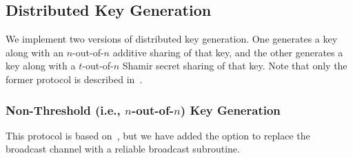 \documentclass[11pt]{article}
\newcommand{\?}[1]{\stackrel{?}{#1}}
\begin{document}
\subsection{Distributed Key Generation}
We implement two versions of distributed key generation. One generates a key along with an $n$-out-of-$n$ additive sharing of that key, and the other generates a key along with a $t$-out-of-$n$ Shamir secret sharing of that key. Note that only the former protocol is described in~\cite{cggmp21}.

\subsubsection{Non-Threshold (i.e., $n$-out-of-$n$) Key Generation}
\label{sec:n-of-n-dkg}

This protocol is based on~\cite[Figure~5]{cggmp21}, but we have added the option to replace the broadcast channel with a reliable broadcast subroutine.
\end{document}
